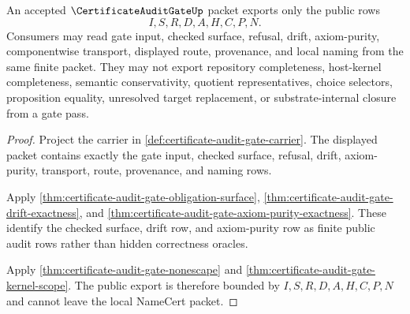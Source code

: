 
\begin{theorem}
\label{thm:certificateauditgate-public-export}
An accepted $\CertificateAuditGateUp$ packet exports only the public rows
$$
I,S,R,D,A,H,C,P,N.
$$
Consumers may read gate input, checked surface, refusal, drift, axiom-purity, componentwise transport, displayed route, provenance, and local naming from the same finite packet. They may not export repository completeness, host-kernel completeness, semantic conservativity, quotient representatives, choice selectors, proposition equality, unresolved target replacement, or substrate-internal closure from a gate pass.
\end{theorem}
\begin{proof}
Project the carrier in \autoref{def:certificate-audit-gate-carrier}. The displayed packet contains exactly the gate input, checked surface, refusal, drift, axiom-purity, transport, route, provenance, and naming rows.

Apply \autoref{thm:certificate-audit-gate-obligation-surface}, \autoref{thm:certificate-audit-gate-drift-exactness}, and \autoref{thm:certificate-audit-gate-axiom-purity-exactness}. These identify the checked surface, drift row, and axiom-purity row as finite public audit rows rather than hidden correctness oracles.

Apply \autoref{thm:certificate-audit-gate-nonescape} and \autoref{thm:certificate-audit-gate-kernel-scope}. The public export is therefore bounded by $I,S,R,D,A,H,C,P,N$ and cannot leave the local NameCert packet.
\end{proof}

